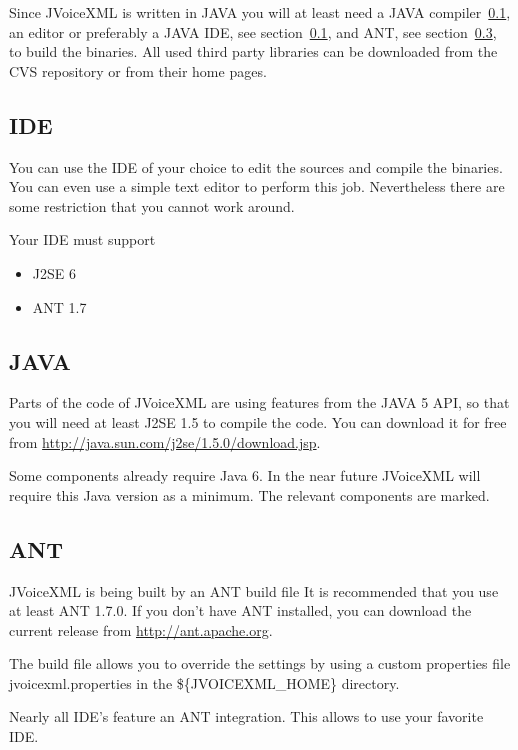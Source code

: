 \documentclass[11pt,a4paper]{article}
\begin{document}
Since JVoiceXML is written in JAVA you will at least need a
JAVA compiler~\ref{sec:ide}, an editor or preferably a JAVA
IDE, see section~\ref{sec:ide}, and ANT, see section~\ref{sec:ant}, to build the
binaries. All used third party libraries can be downloaded from the CVS 
repository or from their home pages.


\subsection{IDE}
\label{sec:ide}

You can use the IDE of your choice to edit the sources and compile the 
binaries. You can even use a simple text editor to perform this job.
Nevertheless there are some restriction that you cannot work around.

Your IDE must support

\begin{itemize}
\item J2SE 6
\item ANT 1.7
\end{itemize}

\subsection{JAVA}
\label{sec:java}

Parts of the code of JVoiceXML are using features from the JAVA 5 API, so that
you will need at least J2SE 1.5 to compile the code. You can download it
for free from \url{http://java.sun.com/j2se/1.5.0/download.jsp}.

Some components already require Java 6. In the near future JVoiceXML will
require this Java version as a minimum. The relevant components are marked. 

\subsection{ANT}
\label{sec:ant}

JVoiceXML is being built by an ANT build file It is recommended that
you use at least ANT 1.7.0. 
If you don't have ANT installed, you can download the current release
from \url{http://ant.apache.org}.

The build file allows you to override the settings by using a custom 
properties file jvoicexml.properties in the \$\{JVOICEXML\_HOME\}
directory.

Nearly all IDE's feature an ANT integration. This allows to use
your favorite IDE.
\end{document}
